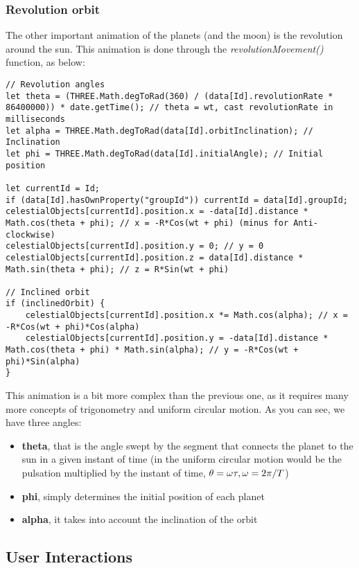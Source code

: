 \documentclass{article}
\begin{document}
\subsubsection{Revolution orbit}
The other important animation of the planets (and the moon) is the revolution around the sun. This animation is done through the \textit{revolutionMovement()} function, as below:
\begin{lstlisting}
// Revolution angles
let theta = (THREE.Math.degToRad(360) / (data[Id].revolutionRate * 86400000)) * date.getTime(); // theta = wt, cast revolutionRate in milliseconds
let alpha = THREE.Math.degToRad(data[Id].orbitInclination); // Inclination
let phi = THREE.Math.degToRad(data[Id].initialAngle); // Initial position

let currentId = Id;
if (data[Id].hasOwnProperty("groupId")) currentId = data[Id].groupId;
celestialObjects[currentId].position.x = -data[Id].distance * Math.cos(theta + phi); // x = -R*Cos(wt + phi) (minus for Anti-clockwise)
celestialObjects[currentId].position.y = 0; // y = 0
celestialObjects[currentId].position.z = data[Id].distance * Math.sin(theta + phi); // z = R*Sin(wt + phi)

// Inclined orbit
if (inclinedOrbit) {
	celestialObjects[currentId].position.x *= Math.cos(alpha); // x = -R*Cos(wt + phi)*Cos(alpha)
	celestialObjects[currentId].position.y = -data[Id].distance * Math.cos(theta + phi) * Math.sin(alpha); // y = -R*Cos(wt + phi)*Sin(alpha)
}
\end{lstlisting}
This animation is a bit more complex than the previous one, as it requires many more concepts of trigonometry and uniform circular motion.
As you can see, we have three angles:
\begin{itemize}
	\item \textbf{theta}, that is the angle swept by the segment that connects the planet to the sun in a given instant of time (in the uniform circular motion would be the pulsation multiplied by the instant of time, $\theta = \omega\tau, \omega = 2\pi\textrm/{T} $)
	\item \textbf{phi}, simply determines the initial position of each planet
	\item \textbf{alpha}, it takes into account the inclination of the orbit
\end{itemize}

\subsection{User Interactions}
\end{document}
